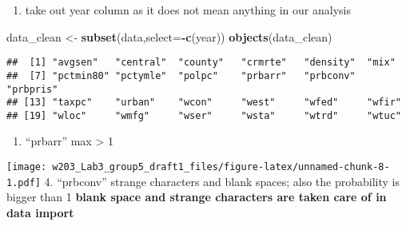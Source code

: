 \documentclass[]{article}
\newenvironment{Shaded}{\begin{snugshade}}{\end{snugshade}}
\newcommand{\KeywordTok}[1]{\textcolor[rgb]{0.13,0.29,0.53}{\textbf{#1}}}
\newcommand{\DataTypeTok}[1]{\textcolor[rgb]{0.13,0.29,0.53}{#1}}
\newcommand{\DecValTok}[1]{\textcolor[rgb]{0.00,0.00,0.81}{#1}}
\newcommand{\StringTok}[1]{\textcolor[rgb]{0.31,0.60,0.02}{#1}}
\newcommand{\OperatorTok}[1]{\textcolor[rgb]{0.81,0.36,0.00}{\textbf{#1}}}
\newcommand{\NormalTok}[1]{#1}
\providecommand{\tightlist}{%
  \setlength{\itemsep}{0pt}\setlength{\parskip}{0pt}}
\begin{document}
\begin{enumerate}
\def\labelenumi{\arabic{enumi}.}
\setcounter{enumi}{1}
\tightlist
\item
  take out year column as it does not mean anything in our analysis
\end{enumerate}

\begin{Shaded}
\begin{Highlighting}[]
\NormalTok{data_clean <-}\StringTok{ }\KeywordTok{subset}\NormalTok{(data,}\DataTypeTok{select=}\OperatorTok{-}\KeywordTok{c}\NormalTok{(year))}
\KeywordTok{objects}\NormalTok{(data_clean)}
\end{Highlighting}
\end{Shaded}

\begin{verbatim}
##  [1] "avgsen"   "central"  "county"   "crmrte"   "density"  "mix"     
##  [7] "pctmin80" "pctymle"  "polpc"    "prbarr"   "prbconv"  "prbpris" 
## [13] "taxpc"    "urban"    "wcon"     "west"     "wfed"     "wfir"    
## [19] "wloc"     "wmfg"     "wser"     "wsta"     "wtrd"     "wtuc"
\end{verbatim}

\begin{enumerate}
\def\labelenumi{\arabic{enumi}.}
\setcounter{enumi}{2}
\tightlist
\item
  ``prbarr'' max \textgreater{} 1
\end{enumerate}

\begin{Shaded}
\end{Shaded}

\texttt{[image: w203\_Lab3\_group5\_draft1\_files/figure-latex/unnamed-chunk-8-1.pdf]}
4. ``prbconv'' strange characters and blank spaces; also the probability
is bigger than 1 \textbf{blank space and strange characters are taken
care of in data import}

\begin{Shaded}
\end{Shaded}
\end{document}
